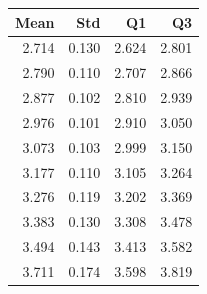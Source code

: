 \begin{tabular}{rrrr}
\toprule
Mean & Std & Q1 & Q3 \\
\midrule
2.714 & 0.130 & 2.624 & 2.801 \\
2.790 & 0.110 & 2.707 & 2.866 \\
2.877 & 0.102 & 2.810 & 2.939 \\
2.976 & 0.101 & 2.910 & 3.050 \\
3.073 & 0.103 & 2.999 & 3.150 \\
3.177 & 0.110 & 3.105 & 3.264 \\
3.276 & 0.119 & 3.202 & 3.369 \\
3.383 & 0.130 & 3.308 & 3.478 \\
3.494 & 0.143 & 3.413 & 3.582 \\
3.711 & 0.174 & 3.598 & 3.819 \\
\bottomrule
\end{tabular}
